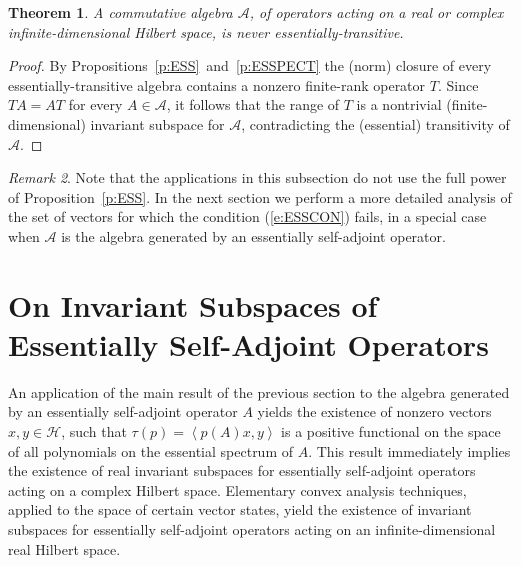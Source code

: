 \documentclass{tran-l}
\newtheorem{thm}{Theorem}[subsection]
\theoremstyle{definition}
\theoremstyle{remark}
\newtheorem{rem}[thm]{Remark}
\numberwithin{equation}{subsection}
\newcommand{\h}{\mathcal{H}}
\newcommand{\A}{\mathcal{A}}
\newcommand{\seq}[1]{\left<#1\right>}
\begin{document}
\begin{thm}\label{t:COMBURN}
A commutative algebra $\A$, of operators acting on a real or complex infinite-dimensional Hilbert space, is \emph{never} essentially-transitive.
\end{thm}

\begin{proof}
By Propositions~\ref{p:ESS}~and~\ref{p:ESSPECT} the (norm) closure of every essentially-transitive algebra contains a nonzero finite-rank operator $T$. Since $T{A}=A{T}$ for every $A\in\A$, it follows that the range of $T$ is a nontrivial (finite-dimensional) invariant subspace for $\A$, contradicting the (essential) transitivity of $\A$.
\end{proof}

\begin{rem}
Note that the applications in this subsection do not use the full power of Proposition~\ref{p:ESS}. In the next section we perform a more detailed analysis of the set of vectors for which the condition (\ref{e:ESSCON}) fails, in a special case when $\A$ is the algebra generated by an essentially self-adjoint operator.
\end{rem}


\section{On Invariant Subspaces of Essentially Self-Adjoint Operators}

An application of the main result of the previous section to the algebra generated by an essentially self-adjoint operator $A$ yields the existence of nonzero vectors $x,y\in\h$, such that $\tau(p)=\seq{p(A)x,y}$ is a positive functional on the space of all polynomials on the essential spectrum of $A$. This result immediately implies the existence of real invariant subspaces for essentially self-adjoint operators acting on a complex Hilbert space. Elementary convex analysis techniques, applied to the space of certain vector states, yield the existence of invariant subspaces for essentially self-adjoint operators acting on an infinite-dimensional real Hilbert space.

\end{document}
